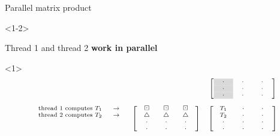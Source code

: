 \documentclass[14pt]{beamer}
\begin{document}
\begin{frame}{Parallel matrix product}

\begin{onlyenv}<1-2>

Thread 1 and thread 2 \textbf{work in parallel}

\vspace{-0.3cm}

\begin{onlyenv}<1>
\[
\scriptsize
\begin{array}{ccc}
&& \left[\begin{array}{ccc}
\ \ \cl{\cdot} \ \ & \ \ \cdot \ \  & \ \ \cdot \ \ \\
\ \ \cl{\cdot} \ \ & \ \ \cdot \ \  & \ \ \cdot \ \ \\
\ \ \cl{\cdot} \ \ & \ \ \cdot \ \  & \ \ \cdot \ \ \\
\end{array}\right]\\
\\
\begin{array}{r}
\text{thread 1 computes }T_1 \ \ \ \ \rw\\
\text{thread 2 computes }T_2 \ \ \ \ \rw\\
\\
\\
\end{array}
& \left[\begin{array}{ccc}
\bd & \bd & \bd \\
\uptri & \uptri & \uptri \\
\ \ \cdot \ \ & \ \ \cdot \ \  & \ \ \cdot \ \ \\
\ \ \cdot \ \ & \ \ \cdot \ \  & \ \ \cdot \ \ \\
\end{array}\right]
& \left[\begin{array}{ccc}
\ T_1 \ & \ \ \cdot \ \  & \ \ \cdot \ \ \\
\ T_2 \ & \ \ \cdot \ \  & \ \ \cdot \ \ \\
\ \ \cdot \ \ & \ \ \cdot \ \  & \ \ \cdot \ \ \\
\ \ \cdot \ \ & \ \ \cdot \ \  & \ \ \cdot \ \ \\
\end{array}\right]
\end{array}
\]
\end{onlyenv}


\end{onlyenv}
\end{frame}
\end{document}

